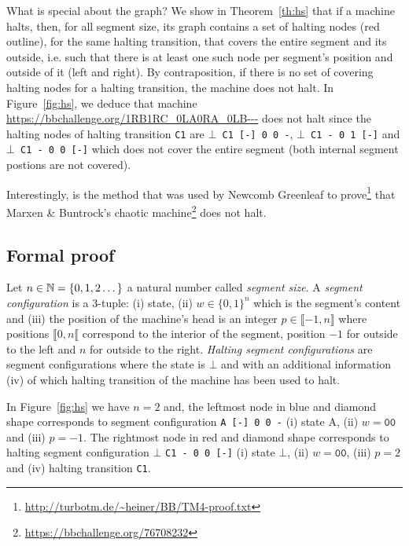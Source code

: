 What is special about the \HS graph? We show in Theorem~\ref{th:hs} that if a machine halts, then, for all segment size, its \HS graph contains a set of halting nodes (red outline), for the same halting transition, that covers the entire segment and its outside, i.e. such that there is at least one such node per segment's position and outside of it (left and right). By contraposition, if there is no set of covering halting nodes for a halting transition, the machine does not halt. In Figure~\ref{fig:hs}, we deduce that machine \url{https://bbchallenge.org/1RB1RC_0LA0RA_0LB---} does not halt since the halting nodes of halting transition \texttt{C1} are \texttt{$\bot$ C1 [-] 0 0 -}, \texttt{$\bot$ C1 - 0 1 [-]} and \texttt{$\bot$ C1 - 0 0 [-]} which does not cover the entire segment (both internal segment postions are not covered).

Interestingly, \HS is the method that was used by Newcomb Greenleaf to prove\footnote{\url{http://turbotm.de/~heiner/BB/TM4-proof.txt}} that Marxen \& Buntrock's chaotic machine\footnote{\url{https://bbchallenge.org/76708232}} \cite{Marxen_1998} does not halt.

\subsection{Formal proof}

\begin{definition}\label{def:hs-conf}\normalfont
  Let $n \in \mathbb{N} = \{0, 1, 2 \dots\}$ a natural number called \textit{segment size}. A \textit{segment configuration} is a 3-tuple: (i) state, (ii) $w \in \{0,1\}^n$ which is the segment's content and (iii) the position of the machine's head is an integer $p \in \llbracket -1, n \rrbracket$ where positions $\llbracket 0,n \llbracket$ correspond to the interior of the segment, position $-1$ for outside to the left and $n$ for outside to the right. \textit{Halting segment configurations} are segment configurations where the state is $\bot$ and with an additional information (iv) of which halting transition of the machine has been used to halt.
\end{definition}

\begin{example}\normalfont
  In Figure~\ref{fig:hs} we have $n=2$ and, the leftmost node in blue and diamond shape corresponds to segment configuration \texttt{A [-] 0 0 -} (i) state A, (ii) $w = \texttt{00}$ and (iii) $p = -1$. The rightmost node in red and diamond shape corresponds to halting segment configuration $\bot$ \texttt{C1 - 0 0 [-]} (i) state $\bot$, (ii) $w = \texttt{00}$, (iii) $p = 2$ and (iv) halting transition \texttt{C1}.
\end{example}

